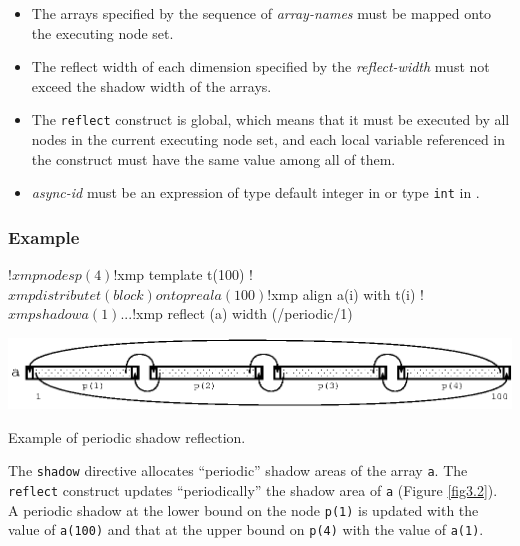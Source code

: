 \begin{itemize}
 \item The arrays specified by the sequence of {\it array-names} must
       be mapped onto the executing node set.
 \item The reflect width of each dimension specified by the {\it
       reflect-width} must not exceed the shadow width of the arrays.
 \item The {\tt reflect} construct is global, which means that it must be
       executed by all nodes in the current executing node set, and each local
       variable referenced in the construct must have the same value
       among all of them.
 \item {\it async-id} must be an expression of type default integer in
       {\XMPF} or type {\tt int} in {\XMPC}.
\end{itemize}

\subsubsection*{Example}

\begin{XFexample}
!$xmp nodes p(4)
!$xmp template t(100)
!$xmp distribute t(block) onto p

      real a(100)
!$xmp align a(i) with t(i)
!$xmp shadow a(1)

      ...
!$xmp reflect (a) width (/periodic/1)
\end{XFexample}

\begin{myfigure}
\begin{center}
\includegraphics[width=0.9\hsize]{figs/fig3.2.eps}
\end{center}
\caption{Example of periodic shadow reflection.}
\label{fig3.2}
\end{myfigure}

The {\tt shadow} directive allocates ``periodic'' shadow areas of the
array {\tt a}.
The {\tt reflect} construct updates ``periodically'' the shadow area of
{\tt a} (Figure \ref{fig3.2}). A periodic shadow at the lower
bound on the node {\tt p(1)} is updated with the value of {\tt a(100)}
and that at the upper bound on {\tt p(4)} with the value of {\tt a(1)}.


